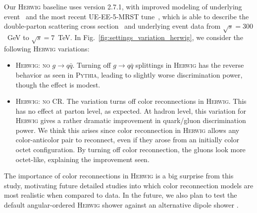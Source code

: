 \documentclass[11pt,letterpaper]{article}
\DeclareRobustCommand{\Fig}[1]{Fig.~\ref{#1}}
\begin{document}
Our \textsc{Herwig} baseline uses version 2.7.1, with improved modeling of underlying event~\cite{Gieseke:2012ft} and the most recent UE-EE-5-MRST tune~\cite{Seymour:2013qka}, which is able to describe the double-parton scattering cross section~\cite{Bahr:2013gkj} and underlying event data from $\sqrt{s} = 300$~GeV to $\sqrt{s} = 7$~TeV.  In \Fig{fig:settings_variation_herwig}, we consider the following  \textsc{Herwig} variations:
\begin{itemize}
\item \textsc{Herwig: no $g \to q\bar{q}$}.  Turning off $g \to q \bar{q}$ splittings in \textsc{Herwig} has the reverse behavior as seen in \textsc{Pythia}, leading to slightly worse discrimination power, though the effect is modest.
\item \textsc{Herwig: no CR}.  The variation turns off color reconnections in \textsc{Herwig}.  This has no effect at parton level, as expected.  At hadron level, this variation for \textsc{Herwig} gives a rather dramatic improvement in quark/gluon discrimination power.  We think this arises since color reconnection in \textsc{Herwig} allows any color-anticolor pair to reconnect, even if they arose from an initially color octet configuration.  By turning off color reconnection, the gluons look more octet-like, explaining the improvement seen.
\end{itemize}
The importance of color reconnections in \textsc{Herwig} is a big surprise from this study, motivating future detailed studies into which color reconnection models are most realistic when compared to data.  In the future, we also plan to test the default angular-ordered \textsc{Herwig} shower against an alternative dipole shower \cite{Platzer:2011bc}.
\end{document}
